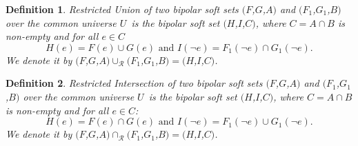 \documentclass{amsart}
\theoremstyle{plain}
\newtheorem{definition}{Definition}
\numberwithin{equation}{section}
\begin{document}
\begin{definition}
\textit{Restricted Union of two bipolar soft sets} $(F$,$G$,$A)$ and $(F_{1}$,$G_{1}$,$B)$ over the common universe $U$\ is the \textit{bipolar} soft set 
$(H$,$I$,$C)$, where $C=A\cap B$ is non-empty and for all $e\in C$\begin{equation*}
H(e)=F(e)\cup G(e)\text{ and }I(\lnot e)=F_{1}(\lnot e)\cap G_{1}(\lnot e)\text{.}
\end{equation*}We denote it by $(F$,$G$,$A)\cup _{\mathcal{R}}(F_{1}$,$G_{1}$,$B)=(H$,$I$,$C)$.
\end{definition}

\begin{definition}
\textit{Restricted Intersection of two bipolar soft sets} $(F$,$G$,$A)$ and $(F_{1}$,$G_{1}$,$B)$ over the common universe $U$\ is the \textit{bipolar}
soft set $(H$,$I$,$C)$, where $C=A\cap B$ is non-empty and for all $e\in C$:\begin{equation*}
H(e)=F(e)\cap G(e)\text{ and }I(\lnot e)=F_{1}(\lnot e)\cup G_{1}(\lnot e)\text{.}
\end{equation*}We denote it by $(F$,$G$,$A)\cap _{\mathcal{R}}(F_{1}$,$G_{1}$,$B)=(H$,$I$,$C)$.
\end{definition}
\end{document}
